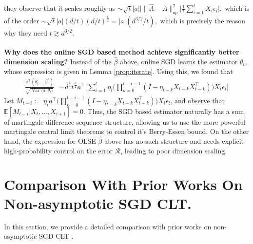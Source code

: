 \documentclass[11pt, reqno,english]{amsart}
\DeclareMathOperator{\Var}{Var} \DeclareMathOperator{\N}{N}
\begin{document}
they observe that it scales roughly as $\sim \sqrt{t}|a|| \|\hat{A} - A\|_{op}^2 \bigg|\frac{1}{t}\sum_{i = 1}^tX_i \epsilon_i \bigg|,$ which is of the order $\sim \sqrt{t} |a| (d/t) (d/t)^{\frac{1}{2}} = |a| (d^{3/2}/t),$ which is precisely the reason why they need $t \gtrsim d^{3/2}$.
\\\\
\textbf{Why does the online SGD based method achieve significantly better dimension scaling?} 
Instead of the $\hat{\beta}$ above, online SGD learns the estimator $\theta_t$, whose expression is given in Lemma \ref{prop:iterate}. Using this, we found that
\begin{align*}
\frac{a^\top(\theta_t - \beta^*)}{\sqrt{\Var \langle a, \theta_t \rangle}} &\sim d^{\frac{1}{4}}t^{\frac{\alpha}{2}}a^\top \bigg[\sum_{i = 1}^t \eta_i \bigg(\prod_{k = 0}^{t-i-1}(I - \eta_{t-k}X_{t-k}X^\top_{t-k})\bigg)X_i\epsilon_i\bigg]
\end{align*}
Let $M_{t-i} := \eta_i a^\top \bigg(\prod_{k = 0}^{t-i-1}(I - \eta_{t-k}X_{t-k}X^\top_{t-k})\bigg)X_i\epsilon_i$, and observe that $\mathbb{E}[M_{t-i} | X_t, \dots, X_{i+1}] = 0$. Thus, the SGD based estimator naturally has a sum of martingale difference sequence structure, allowing us to use the more powerful martingale central limit theorems to control it's Berry-Essen bound. On the other hand, the expression for OLSE $\hat{\beta}$ above has no such structure and needs explicit high-probability control on the error $\mathcal R$, leading to poor dimension scaling.
\section{Comparison With Prior Works On Non-asymptotic SGD CLT.}\label{prior-sgd-clt-comparison}
In this section, we provide a detailed comparison with prior works on non-asymptotic SGD CLT \cite{anastasiou2019normal, shao2022berry, durmus2022finite, durmus2021tight, samsonov2024gaussian, Khusainov2025GaussianApprox, WuLiWeiRinaldo2025InferenceTD, Samsonov2025StatisticalInferenceLSA}.
\end{document}

